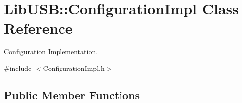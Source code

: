 \hypertarget{class_lib_u_s_b_1_1_configuration_impl}{\section{Lib\-U\-S\-B\-:\-:Configuration\-Impl Class Reference}
\label{class_lib_u_s_b_1_1_configuration_impl}
}


\hyperlink{class_lib_u_s_b_1_1_configuration}{Configuration} Implementation.  




{\ttfamily \#include $<$Configuration\-Impl.\-h$>$}

\subsection*{Public Member Functions}
